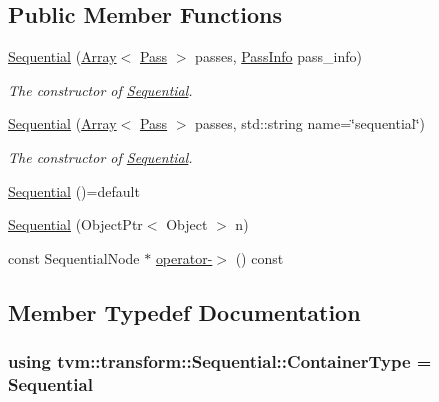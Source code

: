 \subsection*{Public Member Functions}
\begin{DoxyCompactItemize}
\item 
\hyperlink{classtvm_1_1transform_1_1Sequential_a99d7f2f204cb666b33e54c45f679d20c}{Sequential} (\hyperlink{classtvm_1_1Array}{Array}$<$ \hyperlink{classtvm_1_1transform_1_1Pass}{Pass} $>$ passes, \hyperlink{classtvm_1_1transform_1_1PassInfo}{Pass\+Info} pass\+\_\+info)
\begin{DoxyCompactList}\small\item\em The constructor of {\ttfamily \hyperlink{classtvm_1_1transform_1_1Sequential}{Sequential}}. \end{DoxyCompactList}\item 
\hyperlink{classtvm_1_1transform_1_1Sequential_a66bc66cd12ac1bbe8fa958b8f5e19f43}{Sequential} (\hyperlink{classtvm_1_1Array}{Array}$<$ \hyperlink{classtvm_1_1transform_1_1Pass}{Pass} $>$ passes, std\+::string name=\char`\"{}sequential\char`\"{})
\begin{DoxyCompactList}\small\item\em The constructor of {\ttfamily \hyperlink{classtvm_1_1transform_1_1Sequential}{Sequential}}. \end{DoxyCompactList}\item 
\hyperlink{classtvm_1_1transform_1_1Sequential_abfea4507335788cb4d2cf0cfe605d3d6}{Sequential} ()=default
\item 
\hyperlink{classtvm_1_1transform_1_1Sequential_ad8a15a63b3d4a2b10518c7a61a761416}{Sequential} (Object\+Ptr$<$ Object $>$ n)
\item 
const Sequential\+Node $\ast$ \hyperlink{classtvm_1_1transform_1_1Sequential_a4288b854b61021c6ecdbb647c02a6f00}{operator-\/$>$} () const 
\end{DoxyCompactItemize}


\subsection{Member Typedef Documentation}
\subsubsection[{\texorpdfstring{Container\+Type}{ContainerType}}]{\setlength{\rightskip}{0pt plus 5cm}using {\bf tvm\+::transform\+::\+Sequential\+::\+Container\+Type} =  {\bf Sequential}}\hypertarget{classtvm_1_1transform_1_1Sequential_ad1ce40c08602f33656cc82d281f52d9d}{}\label{classtvm_1_1transform_1_1Sequential_ad1ce40c08602f33656cc82d281f52d9d}


